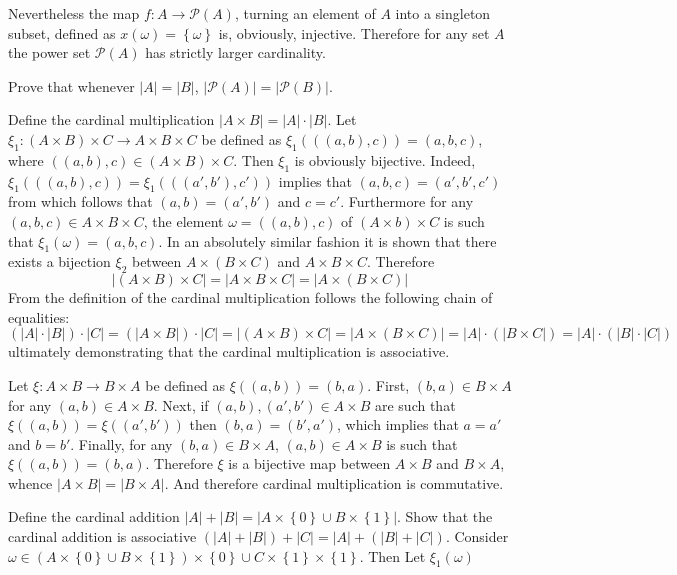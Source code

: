 \documentclass[a4paper]{article}
\newcommand{\obj}[1]{\left\{{#1}\right\}}
\newcommand{\brac}[1]{{\left({#1}\right)}}
\begin{document}
Nevertheless the map $f:A\to \mathcal{P}\brac{A}$, turning an element of $A$ into a singleton subset, defined as $x(\omega)=\obj{\omega}$ is, obviously, injective. Therefore for any set $A$ the power set $\mathcal{P}\brac{A}$ has strictly larger cardinality.

Prove that whenever $|A|=|B|$, $|\mathcal{P}\brac{A}|=|\mathcal{P}\brac{B}|$.

Define the cardinal multiplication $|A\times B| = |A|\cdot |B|$.
Let $\xi_1:\brac{A\times B}\times C \to A\times B\times C$ be defined as $\xi_1(\brac{\brac{a,b},c}) = \brac{a,b,c}$, where $\brac{\brac{a,b},c} \in \brac{A\times B}\times C$. Then $\xi_1$ is obviously bijective. Indeed, $\xi_1(\brac{\brac{a,b},c})=\xi_1(\brac{\brac{a',b'},c'})$ implies that $\brac{a,b,c}=\brac{a',b',c'}$ from which follows that $\brac{a,b}=\brac{a',b'}$ and $c=c'$. Furthermore for any $\brac{a,b,c} \in A\times B\times C$, the element $\omega = \brac{\brac{a,b},c}$ of $\brac{A\times b}\times C$ is such that $\xi_1(\omega)=\brac{a,b,c}$. In an absolutely similar fashion it is shown that there exists a bijection $\xi_2$ between $A\times \brac{B\times C}$ and $A\times B\times C$. Therefore \[|\brac{A\times B}\times C| = |A\times B\times C| = |A\times \brac{B\times C}|\] From the definition of the cardinal multiplication follows the following chain of equalities:\[\brac{|A|\cdot |B|}\cdot |C| = \brac{|A\times B|} \cdot |C| = |\brac{A\times B}\times C| = |A\times \brac{B\times C}| = |A|\cdot \brac{|B\times C|} = |A|\cdot \brac{|B|\cdot |C|}\] ultimately demonstrating that the cardinal multiplication is associative.

Let $\xi: A\times B\to B\times A$ be defined as $\xi(\brac{a,b})=\brac{b,a}$. First, $\brac{b,a}\in B\times A$ for any $\brac{a,b}\in A\times B$. Next, if $\brac{a,b}, \brac{a',b'}\in A\times B$ are such that $\xi(\brac{a,b})=\xi(\brac{a',b'})$ then $\brac{b,a}=\brac{b',a'}$, which implies that $a=a'$ and $b=b'$.
Finally, for any $\brac{b,a}\in B\times A$, $\brac{a,b}\in A\times B$ is such that $\xi(\brac{a,b})=\brac{b,a}$. Therefore $\xi$ is a bijective map between $A\times B$ and $B\times A$, whence $|A\times B| = |B\times A|$. And therefore cardinal multiplication is commutative.

Define the cardinal addition $|A|+|B|=|A\times \obj{0}\cup B\times \obj{1}|$.
Show that the cardinal addition is associative $\brac{|A|+|B|}+|C| = |A|+\brac{|B|+|C|}$.
Consider $\omega\in \brac{A\times \obj{0}\cup B\times \obj{1}}\times \obj{0}\cup C\times \obj{1}\times \obj{1}$. Then
Let $\xi_1(\omega)$ 
\end{document}
